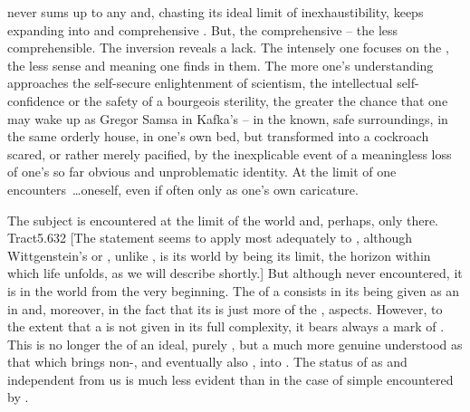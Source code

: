 \pa {} never sums up to any  and, chasting its ideal limit of
inexhaustibility, keeps expanding into  and  comprehensive
. But, the  comprehensive -- the less comprehensible.  The
inversion reveals a lack. The  intensely one focuses on the , the less sense and meaning one finds in them.  The more one's
understanding approaches the self-secure enlightenment of scientism, the
intellectual self-confidence or the safety of a bourgeois sterility, the greater
the chance that one may wake up as Gregor Samsa in Kafka's 
-- in the known, safe surroundings, in the same orderly house, in one's own bed,
but transformed into a cockroach scared, or rather merely pacified, by the
inexplicable event of a meaningless loss of one's so far obvious and unproblematic
identity. At the limit of  one encounters~\ldots oneself, even if often
only as one's own caricature. 

The subject is encountered at the limit of the world and, perhaps, only
there. \citet{The subject does not belong to the world: rather it is a limit of
  the world.}{Tract}{5.632 [The statement seems to apply most adequately to
  , although Wittgenstein's  or 
   , unlike , is
  its world by being its limit, the horizon within which life unfolds, as we
  will describe shortly.]}
%
%
But although never  encountered, it is  in the world
from the very beginning.  The 
 of a  consists in its being given as an 
in  and, moreover, in the fact that its  is just
more of the ,  aspects. However, to the extent that a
 is not given  in its full complexity, it bears
always a mark of . This is no longer the  of
an ideal, purely , but a much more genuine 
understood as that which brings non-, and eventually also
, into .  The status of  as
 and independent from us is much less evident than in the case of
simple  encountered by . 

